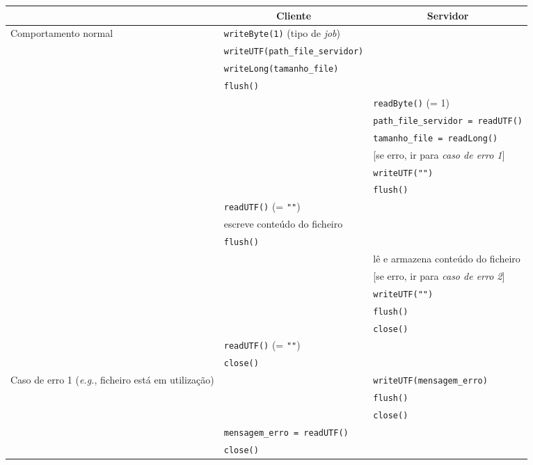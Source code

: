 \begin{table}[p]
    \centering
    \setlength{\tabcolsep}{6.5pt}
    \renewcommand{\arraystretch}{1.15}
    \begin{tabularx}{\textwidth}{|p{2cm}|X|X|}
        \cline{2-3}
        \multicolumn{1}{l|}{} & \multicolumn{1}{c|}{\textbf{Cliente}} & \multicolumn{1}{c|}{\textbf{Servidor}} \\
        \hline \multirow[t]{5}{=}{Comportamento normal}
         & \verb|writeByte(1)| (tipo de \emph{job}) & \\
         & \verb|writeUTF(path_file_servidor)| & \\
         & \verb|writeLong(tamanho_file)| & \\
         & \verb|flush()| & \\
         & & \verb|readByte()| (= 1) \\
         & & \verb|path_file_servidor = readUTF()| \\
         & & \verb|tamanho_file = readLong()| \\
         & & [se erro, ir para \emph{caso de erro 1}] \\
         & & \verb|writeUTF("")| \\
         & & \verb|flush()| \\
         & \verb|readUTF()| (= \verb|""|) & \\
         & escreve conteúdo do ficheiro & \\
         & \verb|flush()| & \\
         & & lê e armazena conteúdo do ficheiro \\
         & & [se erro, ir para \emph{caso de erro 2}] \\
         & & \verb|writeUTF("")| \\
         & & \verb|flush()| \\
         & & \verb|close()| \\
         & \verb|readUTF()| (= \verb|""|) & \\
         & \verb|close()| & \\
        \hline \multirow[t]{5}{=}{Caso de erro 1 (\emph{e.g.}, ficheiro está em utilização)}
         & & \verb|writeUTF(mensagem_erro)| \\
         & & \verb|flush()| \\
         & & \verb|close()| \\
         & \verb|mensagem_erro = readUTF()| & \\
         & \verb|close()| & \\

\end{tabularx}
\end{table}
